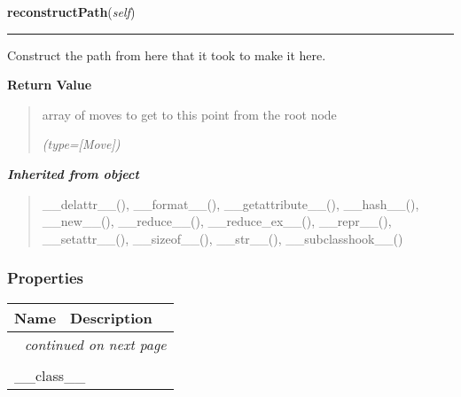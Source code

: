 \hspace{.8\funcindent}\begin{boxedminipage}{\funcwidth}

    \raggedright \textbf{reconstructPath}(\textit{self})

    \vspace{-1.5ex}

    \rule{\textwidth}{0.5\fboxrule}
\setlength{\parskip}{2ex}
    Construct the path from here that it took to make it here.

\setlength{\parskip}{1ex}
      \textbf{Return Value}
    \vspace{-1ex}

      \begin{quote}
      array of moves to get to this point from the root node

      {\it (type=[Move])}

      \end{quote}

    \end{boxedminipage}


\large{\textbf{\textit{Inherited from object}}}

\begin{quote}
\_\_delattr\_\_(), \_\_format\_\_(), \_\_getattribute\_\_(), \_\_hash\_\_(), \_\_new\_\_(), \_\_reduce\_\_(), \_\_reduce\_ex\_\_(), \_\_repr\_\_(), \_\_setattr\_\_(), \_\_sizeof\_\_(), \_\_str\_\_(), \_\_subclasshook\_\_()
\end{quote}


  \subsubsection{Properties}

    \vspace{-1cm}
\hspace{\varindent}\begin{longtable}{|p{\varnamewidth}|p{\vardescrwidth}|l}
\cline{1-2}
\cline{1-2} \centering \textbf{Name} & \centering \textbf{Description}& \\
\cline{1-2}
\endhead\cline{1-2}\multicolumn{3}{r}{\small\textit{continued on next page}}\\\endfoot\cline{1-2}
\endlastfoot\multicolumn{2}{|l|}{\textit{Inherited from object}}\\
\multicolumn{2}{|p{\varwidth}|}{\raggedright \_\_class\_\_}\\
\cline{1-2}
\end{longtable}

